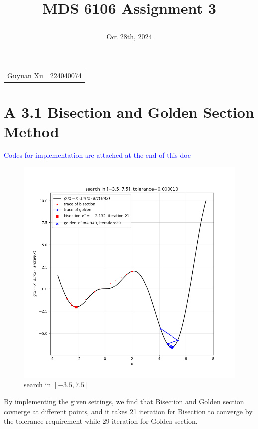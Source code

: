 \documentclass{article}
\newcommand{\secs}[1]{\section*{#1}}
\begin{document}
\title{\raggedright MDS 6106 Assignment 3}
\date{Oct 28th, 2024}
\maketitle

\noindent\begin{tabular}{@{}ll}
   Guyuan Xu &\href{mailto:224040074@link.cuhk.edu.cn}{224040074} \\
    
%
\end{tabular}
\secs{A 3.1 Bisection and Golden Section Method}
\noindent\textcolor{blue}{Codes for implementation are attached at the end of this doc}\\
\begin{figure}[h]
    \centering
    \includegraphics[scale = 0.8]{left_-3.5_right_7.5.png}
    \caption{search in $[-3.5,7.5]$}
\end{figure}
By implementing the given settings, we find that Bisection and Golden section covnerge at different points, and it takes 21 iteration for Bisection to converge by the tolerance requirement while 29 iteration for Golden section.\\\vspace{5mm}
\end{document}
